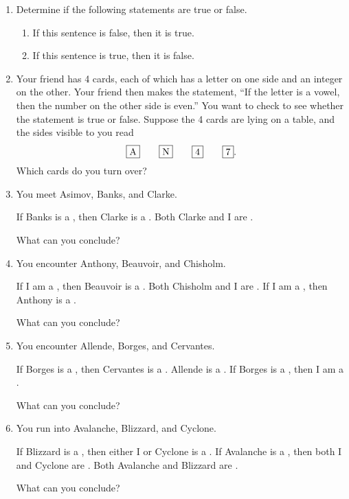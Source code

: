 \probsec{~\ref{sec:conditionals}}
\begin{enumerate}
    \item Determine if the following statements are true or false.
  \begin{enumerate}
      \item If this sentence is false, then it is true.
      \item If this sentence is true, then it is false.
  \end{enumerate}

    \item Your friend has 4 cards, each of which has a letter on one side and an integer on the other. Your friend then makes the statement, ``If the letter is a vowel, then the number on the other side is even.'' You want to check to see whether the statement is true or false. Suppose the 4 cards are lying on a table, and the sides visible to you read
  \[
  \framebox{A} \qquad \framebox{N} \qquad \framebox{4} \qquad \framebox{7}.
  \]
  Which cards do you turn over?

    \item You meet Asimov, Banks, and Clarke.
  \begin{dialogue}
     If Banks is a \knight, then Clarke is a \knave.
     Both Clarke and I are \knaves.
  \end{dialogue}
  What can you conclude?

    \item You encounter Anthony, Beauvoir, and Chisholm.
  \begin{dialogue}
     If I am a \knave, then Beauvoir is a \knave.
     Both Chisholm and I are \knaves.
     If I am a \knave, then Anthony is a \knight.
  \end{dialogue}
  What can you conclude?

    \item You encounter Allende, Borges, and Cervantes.
  \begin{dialogue}
     If Borges is a \knight, then Cervantes is a \knave.
     Allende is a \knave.
     If Borges is a \knight, then I am a \knave.
  \end{dialogue}
  What can you conclude?

    \item You run into Avalanche, Blizzard, and Cyclone.
  \begin{dialogue}
     If Blizzard is a \knight, then either I or Cyclone is a \knave.
     If Avalanche is a \knave, then both I and Cyclone are \knights.
     Both Avalanche and Blizzard are \knaves.
  \end{dialogue}
  What can you conclude?


\end{enumerate}

